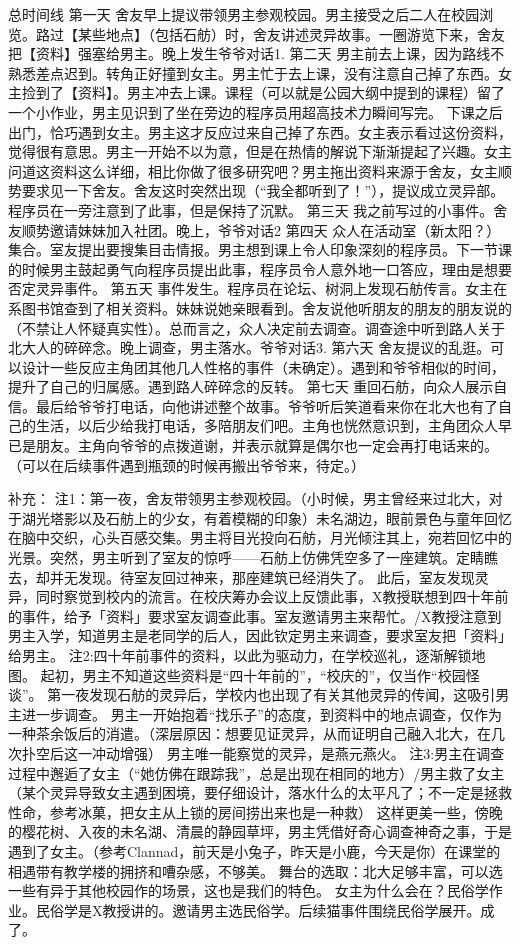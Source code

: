 总时间线
第一天	舍友早上提议带领男主参观校园。男主接受之后二人在校园浏览。路过【某些地点】（包括石舫）时，舍友讲述灵异故事。一圈游览下来，舍友把【资料】强塞给男主。晚上发生爷爷对话1.
第二天	男主前去上课，因为路线不熟悉差点迟到。转角正好撞到女主。男主忙于去上课，没有注意自己掉了东西。女主捡到了【资料】。男主冲去上课。课程（可以就是公园大纲中提到的课程）留了一个小作业，男主见识到了坐在旁边的程序员用超高技术力瞬间写完。 下课之后出门，恰巧遇到女主。男主这才反应过来自己掉了东西。女主表示看过这份资料，觉得很有意思。男主一开始不以为意，但是在热情的解说下渐渐提起了兴趣。女主问道这资料这么详细，相比你做了很多研究吧？男主拖出资料来源于舍友，女主顺势要求见一下舍友。舍友这时突然出现（“我全都听到了！”），提议成立灵异部。程序员在一旁注意到了此事，但是保持了沉默。
第三天	我之前写过的小事件。舍友顺势邀请妹妹加入社团。晚上，爷爷对话2
第四天	众人在活动室（新太阳？）集合。室友提出要搜集目击情报。男主想到课上令人印象深刻的程序员。下一节课的时候男主鼓起勇气向程序员提出此事，程序员令人意外地一口答应，理由是想要否定灵异事件。
第五天	事件发生。程序员在论坛、树洞上发现石舫传言。女主在系图书馆查到了相关资料。妹妹说她亲眼看到。舍友说他听朋友的朋友的朋友说的（不禁让人怀疑真实性）。总而言之，众人决定前去调查。调查途中听到路人关于北大人的碎碎念。晚上调查，男主落水。爷爷对话3.
第六天	舍友提议的乱逛。可以设计一些反应主角团其他几人性格的事件（未确定）。遇到和爷爷相似的时间，提升了自己的归属感。遇到路人碎碎念的反转。
第七天	重回石舫，向众人展示自信。最后给爷爷打电话，向他讲述整个故事。爷爷听后笑道看来你在北大也有了自己的生活，以后少给我打电话，多陪朋友们吧。主角也恍然意识到，主角团众人早已是朋友。主角向爷爷的点拨道谢，并表示就算是偶尔也一定会再打电话来的。（可以在后续事件遇到瓶颈的时候再搬出爷爷来，待定。）

补充：
注1：第一夜，舍友带领男主参观校园。（小时候，男主曾经来过北大，对于湖光塔影以及石舫上的少女，有着模糊的印象）未名湖边，眼前景色与童年回忆在脑中交织，心头百感交集。男主将目光投向石舫，月光倾注其上，宛若回忆中的光景。突然，男主听到了室友的惊呼——石舫上仿佛凭空多了一座建筑。定睛瞧去，却并无发现。待室友回过神来，那座建筑已经消失了。
此后，室友发现灵异，同时察觉到校内的流言。在校庆筹办会议上反馈此事，X教授联想到四十年前的事件，给予「资料」要求室友调查此事。室友邀请男主来帮忙。/X教授注意到男主入学，知道男主是老同学的后人，因此钦定男主来调查，要求室友把「资料」给男主。
注2:四十年前事件的资料，以此为驱动力，在学校巡礼，逐渐解锁地图。
起初，男主不知道这些资料是“四十年前的”，“校庆的”，仅当作“校园怪谈”。
第一夜发现石舫的灵异后，学校内也出现了有关其他灵异的传闻，这吸引男主进一步调查。
男主一开始抱着“找乐子”的态度，到资料中的地点调查，仅作为一种茶余饭后的消遣。（深层原因：想要见证灵异，从而证明自己融入北大，在几次扑空后这一冲动增强）
男主唯一能察觉的灵异，是燕元燕火。
注3:男主在调查过程中邂逅了女主（“她仿佛在跟踪我”，总是出现在相同的地方）/男主救了女主（某个灵异导致女主遇到困境，要仔细设计，落水什么的太平凡了；不一定是拯救性命，参考冰菓，把女主从上锁的房间捞出来也是一种救）
这样更美一些，傍晚的樱花树、入夜的未名湖、清晨的静园草坪，男主凭借好奇心调查神奇之事，于是遇到了女主。（参考Clannad，前天是小兔子，昨天是小鹿，今天是你）在课堂的相遇带有教学楼的拥挤和嘈杂感，不够美。
舞台的选取：北大足够丰富，可以选一些有异于其他校园作的场景，这也是我们的特色。
女主为什么会在？民俗学作业。民俗学是X教授讲的。邀请男主选民俗学。后续猫事件围绕民俗学展开。成了。


